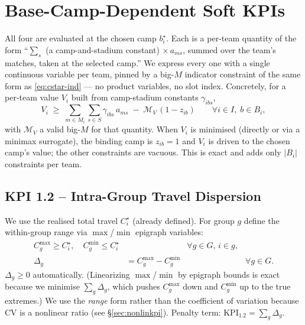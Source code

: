 \documentclass[12pt, letterpaper]{article}
\begin{document}
\section{Base-Camp-Dependent Soft KPIs}
\label{sec:bc-kpi}

All four are evaluated at the chosen camp $b_i^\star$. Each is a per-team
quantity of the form ``$\sum_s$ (a camp-and-stadium constant)
$\times\,a_{ms}$, summed over the team's matches, taken at the selected
camp.'' We express every one with a single continuous variable per team,
pinned by a big-$M$ indicator constraint of the same form as
\eqref{eq:cstar-ind} --- no product variables, no slot index. Concretely,
for a per-team value $V_i$ built from camp-stadium constants
$\gamma_{ibs}$,
\begin{equation}
V_i \;\ge\; \sum_{m\in M_i}\sum_{s\in S}\gamma_{ibs}\,a_{ms}
  \;-\;\mathcal{M}_V\,(1-z_{ib})
  \qquad\forall i\in I,\;b\in B_i,
\label{eq:vind}
\end{equation}
with $\mathcal{M}_V$ a valid big-$M$ for that quantity. When $V_i$ is
minimised (directly or via a minimax surrogate), the binding camp is
$z_{ib}=1$ and $V_i$ is driven to the chosen camp's value; the other
constraints are vacuous. This is exact and adds only $|B_i|$ constraints
per team.

\subsection{KPI 1.2 -- Intra-Group Travel Dispersion}
We use the realised total travel $C_i^\star$ (already defined). For group
$g$ define the within-group range via $\max$/$\min$ epigraph variables:
\begin{align}
C^{\max}_g \ge C_i^\star,\quad
C^{\min}_g \le C_i^\star &&\forall g\in G,\,i\in g,\\
\Delta_g &= C^{\max}_g - C^{\min}_g &&\forall g\in G.
\end{align}
$\Delta_g\ge0$ automatically. (Linearizing $\max$/$\min$ by epigraph
bounds is exact because we minimise $\sum_g\Delta_g$, which pushes
$C^{\max}_g$ down and $C^{\min}_g$ up to the true extremes.) We use the
\emph{range} form rather than the coefficient of variation because CV is a
nonlinear ratio (see \S\ref{sec:nonlinkpi}). Penalty term:
$\mathrm{KPI}_{1.2}=\sum_{g} \Delta_g$.
\end{document}
